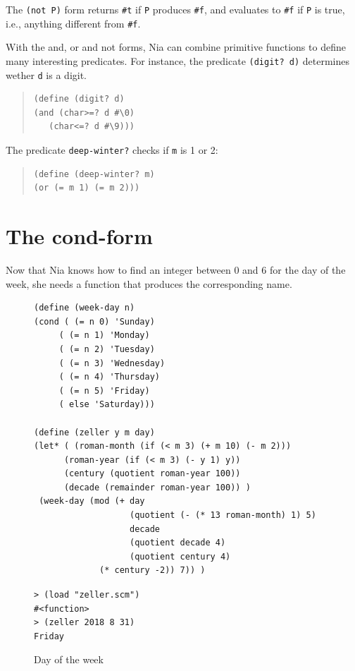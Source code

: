 \documentclass[a4paper,12pt]{book}
\newenvironment{fmpage}[1]
           {\begin{lrbox}{\fmbox}\begin{minipage}{#1}}
           {\end{minipage}\end{lrbox}\fbox{\usebox{\fmbox}}}
\begin{document}
The \verb|(not P)| form returns \verb|#t|
if \verb|P| produces \verb|#f|, and
evaluates to \verb|#f| if \verb|P| is true,
i.e., anything different from \verb|#f|.

With the and, or and not forms, Nia can
combine primitive functions to define
many interesting predicates. For instance,
the predicate \verb|(digit? d)| determines
wether \verb|d| is a digit.
\begin{quote}
\begin{verbatim}
(define (digit? d)
(and (char>=? d #\0)
   (char<=? d #\9)))
\end{verbatim}
\end{quote}
The predicate \verb|deep-winter?| checks if
\verb|m| is 1 or 2:
\begin{quote}
\begin{verbatim}
(define (deep-winter? m)
(or (= m 1) (= m 2)))
\end{verbatim}
\end{quote}


\section{The cond-form}\label{page:cond-form}
Now that Nia knows how to find
an integer between 0 and 6 for the 
day of the week, she needs a function
that produces the corresponding name.


\begin{figure}[!h]
\begin{fmpage}{\linewidth}
\begin{verbatim}
(define (week-day n)
(cond ( (= n 0) 'Sunday)
     ( (= n 1) 'Monday)
     ( (= n 2) 'Tuesday)
     ( (= n 3) 'Wednesday)
     ( (= n 4) 'Thursday)
     ( (= n 5) 'Friday)
     ( else 'Saturday)))

(define (zeller y m day)
(let* ( (roman-month (if (< m 3) (+ m 10) (- m 2)))
      (roman-year (if (< m 3) (- y 1) y))
      (century (quotient roman-year 100))
      (decade (remainder roman-year 100)) )
 (week-day (mod (+ day
                   (quotient (- (* 13 roman-month) 1) 5)
                   decade
                   (quotient decade 4)
                   (quotient century 4)
             (* century -2)) 7)) )

\end{verbatim}
\end{fmpage}

\begin{fmpage}{\linewidth}
\verb|> (load "zeller.scm")|\\
\verb|#<function>|\\
\verb|> (zeller 2018 8 31)|\\
\verb|Friday|
\end{fmpage}
\caption{Day of the week}
\label{fig:day-of-the-week}
\end{figure}
\end{document}
